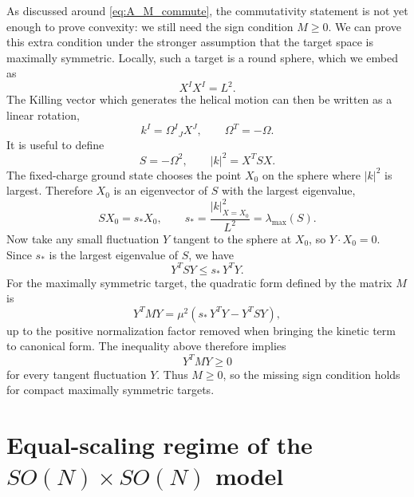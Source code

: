 \documentclass[a4paper,11pt]{article}
\begin{document}
\begin{appendix}
As discussed around \eqref{eq:A_M_commute}, the commutativity statement is not yet enough to prove convexity: we still need the sign condition $M\geq0$. We can prove this extra condition under the stronger assumption that
the target space is maximally symmetric. Locally, such a target is a round sphere, which we embed as
\begin{equation}
  X^I X^I=L^2 .
\end{equation}
The Killing vector which generates the helical motion can then be written as a linear rotation,
\begin{equation}
  k^I=\Omega^I{}_J X^J, \qquad \Omega^T=-\Omega .
\end{equation}
It is useful to define
\begin{equation}
  S=-\Omega^2, \qquad |k|^2=X^T S X .
\end{equation}
The fixed-charge ground state chooses the point $X_0$ on the sphere where $|k|^2$ is largest. Therefore $X_0$ is an eigenvector of $S$ with the largest eigenvalue,
\begin{equation}
  S X_0=s_* X_0, \qquad s_*=\frac{|k|^2_{X=X_0}}{L^2}=\lambda_{\max}(S).
\end{equation}
Now take any small fluctuation $Y$ tangent to the sphere at $X_0$, so $Y\cdot X_0=0$. Since $s_*$ is the largest eigenvalue of $S$, we have
\begin{equation}
  Y^T S Y\leq s_*\,Y^T Y .
\end{equation}
For the maximally symmetric target, the quadratic form defined by the matrix
$M$ is
\begin{equation}
  Y^T M Y = \mu^2\left(s_*\,Y^T Y-Y^T S Y\right),
\end{equation}
up to the positive normalization factor removed when bringing the kinetic term to canonical form. The inequality above therefore implies
\begin{equation}
  Y^T M Y\geq0
\end{equation}
for every tangent fluctuation $Y$. Thus $M\geq0$, so the missing sign condition holds for compact maximally symmetric targets.


\section{Equal-scaling regime of the $SO(N)\times SO(N)$ model}\label{app:equal-scaling}


\end{appendix}
\end{document}
